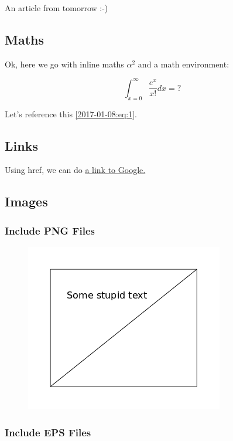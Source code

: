 
An article from tomorrow :-)

\subsection{Maths}

Ok, here we go with inline maths $\alpha^2$ and a math environment:

\begin{equation}
\label{2017-01-08:eq:1}
\int_{x=0}^\infty \frac{e^x}{x!} dx = ?
\end{equation}

Let's reference this \eqref{2017-01-08:eq:1}.

\subsection{Links}

Using href, we can do \href{http://www.google.at}{a link to Google.}

\subsection{Images}

\subsubsection{Include PNG Files}

\begin{figure}[H]
    \includegraphics[scale=0.5]{images/drawing.png}
\end{figure}

\subsubsection{Include EPS Files}

